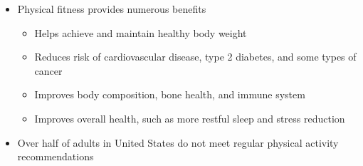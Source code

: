 \documentclass[12pt]{article}
\begin{document}
\begin{itemize}
                \item Physical fitness provides numerous benefits
                    \begin{itemize}
                        \item Helps achieve and maintain healthy body weight
                        \item Reduces risk of cardiovascular disease, type 2 diabetes, and some types of cancer
                        \item Improves body composition, bone health, and immune system
                        \item Improves overall health, such as more restful sleep and stress reduction
                    \end{itemize}
                \item Over half of adults in United States do not meet regular physical activity recommendations
            \end{itemize}
\end{document}
